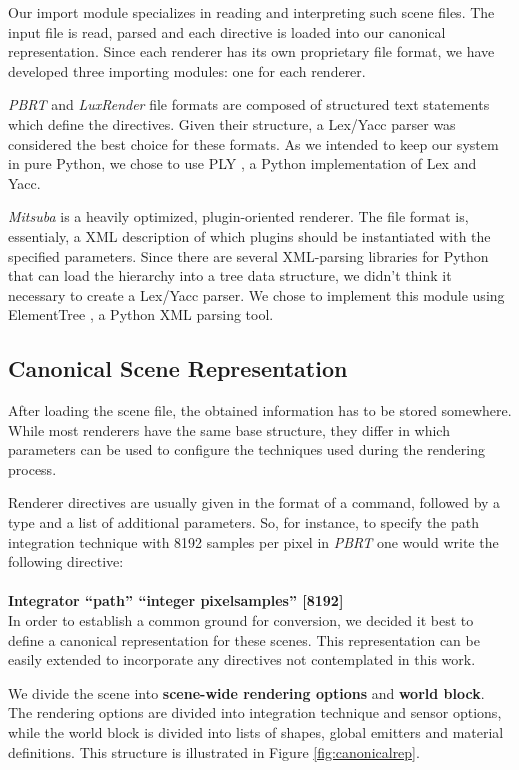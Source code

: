 Our import module specializes in reading and interpreting such scene files. The
input file is read, parsed and each directive is loaded into our canonical
representation. Since each renderer has its own proprietary file format, we have
developed three importing modules: one for each renderer.

\textit{PBRT} and \textit{LuxRender} file formats are composed of structured
text statements which define the directives. Given their structure, a Lex/Yacc
parser was considered the best choice for these formats. As we intended to keep
our system in pure Python, we chose to use PLY \cite{ply}, a Python
implementation of Lex and Yacc.

\textit{Mitsuba} is a heavily optimized, plugin-oriented renderer. The file
format is, essentialy, a XML description of which plugins should be instantiated
with the specified parameters. Since there are several
XML-parsing libraries for Python that can load the hierarchy into a tree data
structure, we didn't think it necessary to create a Lex/Yacc parser. We chose to
implement this module using ElementTree \cite{ET}, a Python XML parsing tool.

\subsection{Canonical Scene Representation}
After loading the scene file, the obtained information has to be
stored somewhere. While most renderers have the same base structure, they differ
in which parameters can be used to configure the techniques used during the
rendering process.

Renderer directives are usually given in the format of a command, followed by a
type and a list of additional parameters. So, for instance, to specify the path
integration technique with 8192 samples per pixel in \textit{PBRT} one would
write the following directive: \\ \\
\indent \textbf{Integrator ``path'' ``integer pixelsamples'' [8192]}\\

In order to establish a common ground for conversion, we decided it best to
define a canonical representation for these scenes. This representation can be
easily extended to incorporate any directives not contemplated in this work.

We divide the scene into \textbf{scene-wide rendering options} and \textbf{world
block}. The rendering options are divided into integration technique and sensor
options, while the world block is divided into lists of shapes, global emitters
and material definitions. This structure is illustrated in Figure
\ref{fig:canonicalrep}.

